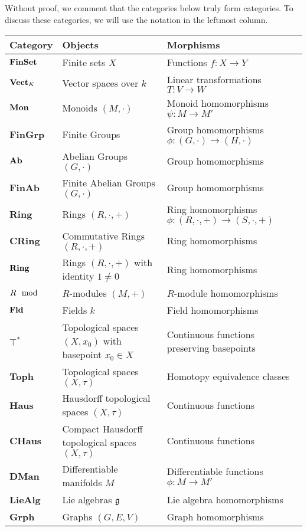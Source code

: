     Without proof, we comment that the categories below truly form categories. 
    To discuss these categories, we will use the notation in the leftmost column.
    \begin{center}
        \begin{tabular}{ |p{1.5cm}||p{6cm}||p{8cm}|  }
            \hline
            Category & Objects & Morphisms\\
            \hline
            $\operatorname{\mathbf{FinSet}}$ & Finite sets $X$ & Functions $f: X \to Y$\\
            $\operatorname{\mathbf{Vect}}_K$ & Vector spaces over $k$ & Linear transformations $T: V \to W$\\
            $\operatorname{\mathbf{Mon}}$ & Monoids $(M, \cdot)$ & Monoid homomorphisms $\psi: M \to M'$\\
            \textbf{FinGrp} & Finite Groups & Group homomorphisms $\phi: (G, \cdot) \to (H, \cdot)$\\
            $\operatorname{\mathbf{Ab}}$ & Abelian Groups $(G, \cdot)$ & Group homomorphisms\\
            \textbf{FinAb} & Finite Abelian Groups $(G, \cdot)$ & Group homomorphisms\\
            \textbf{Ring} & Rings $(R, \cdot, +)$ & Ring homomorphisms $\phi: (R, \cdot, +) \to (S, \cdot, +)$\\
            \textbf{CRing} & Commutative Rings $(R, \cdot, +)$ & Ring homomorphisms \\
            $\operatorname{\mathbf{Ring}}$ & Rings $(R, \cdot, +)$ with identity $1 \ne 0$ & Ring homomorphisms\\
            $R\mod$& $R$-modules $(M, +)$ & $R$-module homomorphisms\\
            $\operatorname{\mathbf{Fld}}$ & Fields $k$ & Field homomorphisms\\
            $\top^*$ & Topological spaces $(X, x_0)$ with basepoint $x_0 \in X$  & Continuous functions preserving basepoints\\
            \textbf{Toph} & Topological spaces $(X, \tau)$ & Homotopy equivalence classes \\
            \textbf{Haus} & Hausdorff topological spaces $(X, \tau)$ & Continuous functions\\
            \textbf{CHaus} & Compact Hausdorff topological spaces $(X, \tau)$ & Continuous functions\\
            \textbf{DMan} & Differentiable manifolds $M$ & Differentiable functions $\phi: M \to M'$\\
            \textbf{LieAlg} & Lie algebras $\mathfrak{g}$ & Lie algebra homomorphisms\\
            \textbf{Grph} & Graphs $(G, E, V)$ & Graph homomorphisms\\
            \hline
           \end{tabular}
    \end{center}

